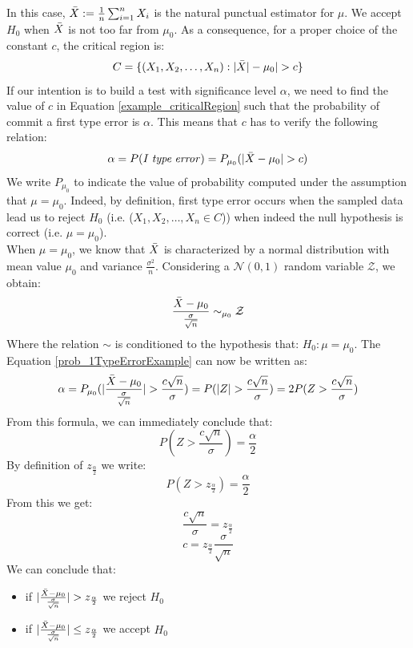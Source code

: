 In this case, $\Bar{X}:= \frac{1}{n}\sum_{i=1}^{n}X_{i}$ is the natural punctual
estimator for $\mu$. We accept $H_{0}$ when $\Bar{X}$ is not too far from
$\mu_{0}$. As a consequence, for a proper choice of the constant $c$, the critical
region is:
\begin{equation}
	\label{example_criticalRegion}C = \{(X_{1},X_{2},\hdots,X_{n}) : |\Bar{X}|-\mu_{0}
	|>c\}
\end{equation}
If our intention is to build a test with significance level $\alpha$, we need to
find the value of $c$ in Equation \ref{example_criticalRegion} such that the probability
of commit a first type error is $\alpha$. This means that $c$ has to verify the
following relation:
\begin{equation}
	\label{prob_1TypeErrorExample}\alpha = P(\mathit{I \; type \; error}) = P_{\mu_0}
	(|\Bar{X}-\mu_{0}|>c)
\end{equation}
We write $P_{\mu_0}$ to indicate the value of probability computed under the assumption
that $\mu = \mu_{0}$. Indeed, by definition, first type error occurs when the
sampled data lead us to reject $H_{0}$ (i.e. ($X_{1}, X_{2}, \hdots, X_{n}\in C$))
when indeed the null hypothesis is correct (i.e. $\mu=\mu_{0}$).\\ When
$\mu =\mu_{0}$, we know that $\Bar{X}$ is characterized by a normal distribution
with mean value $\mu_{0}$ and variance $\frac{\sigma^{2}}{n}$. Considering a
$\mathcal{N}(0,1)$ random variable $\mathcal{Z}$, we obtain:
\begin{equation}
	\frac{\Bar{X}-\mu_{0}}{\frac{\sigma}{\sqrt{n}}}\sim_{\mu_0}\mathcal{Z}
\end{equation}
Where the relation $\sim$ is conditioned to the hypothesis that: $H_{0}: \mu = \mu
_{0}$. The Equation \ref{prob_1TypeErrorExample} can now be written as:
\[
	\alpha = P_{\mu_0}(|\frac{\Bar{X}-\mu_{0}}{\frac{\sigma}{\sqrt{n}}}| > \frac{c
	\sqrt{n}}{\sigma}) = P(|Z| > \frac{c \sqrt{n}}{\sigma}) = 2P(Z > \frac{c
	\sqrt{n}}{\sigma})
\]
From this formula, we can immediately conclude that:
\[
	P(Z > \frac{c \sqrt{n}}{\sigma}) = \frac{\alpha}{2}
\]
By definition of $z_{\frac{\alpha}{2}}$ we write:
\[
	P(Z > z_{\frac{\alpha}{2}}) = \frac{\alpha}{2}
\]
From this we get:
\[
	\frac{c \sqrt{n}}{\sigma}= z_{\frac{\alpha}{2}}
\]
\[
	c = z_{\frac{\alpha}{2}}\frac{\sigma}{\sqrt{n}}
\]
We can conclude that:
\begin{itemize}
	\item if $|\frac{\Bar{X}-\mu_{0}}{\frac{\sigma}{\sqrt{n}}}|>z_{\frac{\alpha}{2}}$
		we reject $H_{0}$

	\item if $|\frac{\Bar{X}-\mu_{0}}{\frac{\sigma}{\sqrt{n}}}| \leq z_{\frac{\alpha}{2}}$
		we accept $H_{0}$
\end{itemize}
